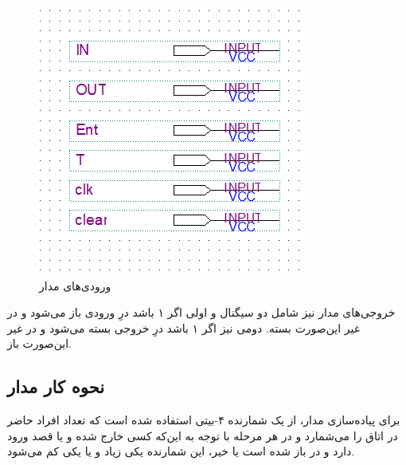 \documentclass[12pt,onecolumn,a4paper,fleqn]{article}
\begin{document}
	\begin{figure}[H]
		\centering
		\includegraphics[scale=0.8]{source/interface.png}
		\caption{ورودی‌های مدار}
		\label{fig:interface}
	\end{figure}
	خروجی‌های مدار نیز شامل دو سیگنال 
	و
	اولی اگر ۱ باشد درِ ورودی باز می‌شود و در غیر این‌صورت بسته. دومی نیز اگر ۱ باشد درِ خروجی بسته می‌شود و در غیر این‌صورت باز.
	\subsection{نحوه کار مدار}
	برای پیاده‌سازی مدار، از یک شمارنده ۴-بیتی استفاده شده است که تعداد افراد حاضر در اتاق را می‌شمارد و در هر مرحله با توجه به این‌که کسی خارج شده و یا قصد ورود دارد و در باز شده است یا خیر، این شمارنده یکی زیاد و یا یکی کم می‌شود.
	
\end{document}
